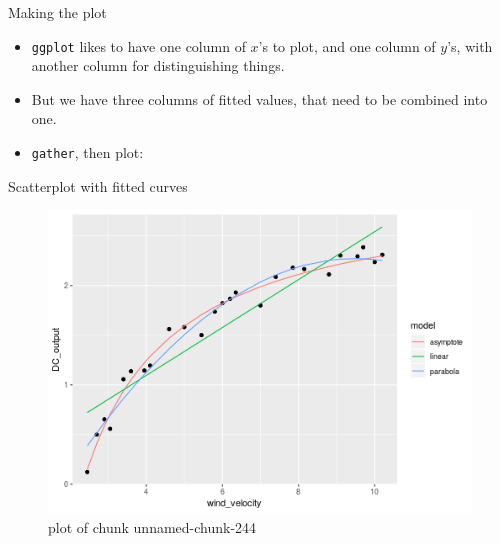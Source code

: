 \documentclass[ignorenonframetext,]{beamer}
\newenvironment{Shaded}{\begin{snugshade}}{\end{snugshade}}
\newcommand{\DataTypeTok}[1]{\textcolor[rgb]{0.13,0.29,0.53}{#1}}
\newcommand{\KeywordTok}[1]{\textcolor[rgb]{0.13,0.29,0.53}{\textbf{#1}}}
\newcommand{\NormalTok}[1]{#1}
\newcommand{\OperatorTok}[1]{\textcolor[rgb]{0.81,0.36,0.00}{\textbf{#1}}}
\newcommand{\StringTok}[1]{\textcolor[rgb]{0.31,0.60,0.02}{#1}}
\providecommand{\tightlist}{%
  \setlength{\itemsep}{0pt}\setlength{\parskip}{0pt}}
\begin{document}
\begin{frame}[fragile]{Making the plot}
\protect\hypertarget{making-the-plot}{}

\begin{itemize}
\tightlist
\item
  \texttt{ggplot} likes to have one column of \(x\)'s to plot, and one
  column of \(y\)'s, with another column for distinguishing things.
\item
  But we have three columns of fitted values, that need to be combined
  into one.
\item
  \texttt{gather}, then plot:
\end{itemize}

\begin{Shaded}
\end{Shaded}

\end{frame}

\begin{frame}{Scatterplot with fitted curves}
\protect\hypertarget{scatterplot-with-fitted-curves}{}

\begin{figure}
\centering
\includegraphics{figure/unnamed-chunk-244-1.png}
\caption{plot of chunk unnamed-chunk-244}
\end{figure}

\end{frame}
\end{document}
